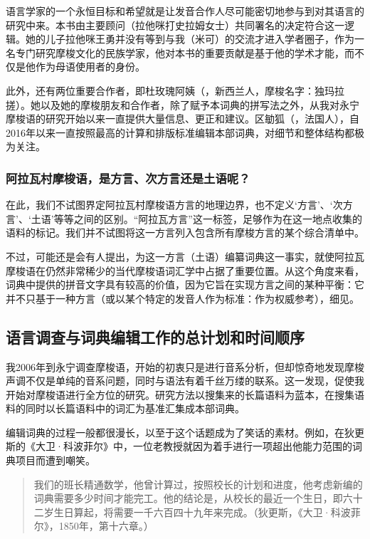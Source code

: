 语言学家的一个永恒目标和希望就是让发音合作人尽可能密切地参与到对其语言的研究中来。本书由主要顾问（拉他咪打史拉姆女士）共同署名的决定符合这一逻辑。她的儿子拉他咪王勇并没有等到与我（米可）的交流才进入学者圈子，作为一名专门研究摩梭文化的民族学家，他对本书的重要贡献是基于他的学术才能，而不仅是他作为母语使用者的身份。

此外，还有两位重要合作者，即杜玫瑰阿姨（，新西兰人，摩梭名字：独玛拉搓）。她以及她的摩梭朋友和合作者，除了赋予本词典的拼写法之外，从我对永宁摩梭语的研究开始以来一直提供大量信息、更正和建议。区勄狐（，法国人），自2016年以来一直按照最高的计算和排版标准编辑本部词典，对细节和整体结构都极为关注。

\subsubsection*{阿拉瓦村摩梭语，是方言、次方言还是土语呢？}

在此，我们不试图界定阿拉瓦村摩梭语方言的地理边界，也不定义‘方言’、‘次方言’、‘土语’等等之间的区别。“阿拉瓦方言”这一标签，足够作为在这一地点收集的语料的标记。我们并不试图将这一方言列入包含所有摩梭方言的某个综合清单中。

不过，可能还是会有人提出，为这一方言（土语）编纂词典这一事实，就使阿拉瓦摩梭语在仍然非常稀少的当代摩梭语词汇学中占据了重要位置。从这个角度来看，词典中提供的拼音文字具有较高的价值，因为它旨在实现方言之间的某种平衡：它并不只基于一种方言（或以某个特定的发音人作为标准：作为权威参考），细见\textcite{dobbs_ortho_2018}。

\subsection{语言调查与词典编辑工作的总计划和时间顺序}

我2006年到永宁调查摩梭语，开始的初衷只是进行音系分析，但却惊奇地发现摩梭声调不仅是单纯的音系问题，同时与语法有着千丝万缕的联系。这一发现，促使我开始对摩梭语进行全方位的研究。研究方法以搜集来的长篇语料为蓝本，在搜集语料的同时以长篇语料中的词汇为基准汇集成本部词典。

编辑词典的过程一般都很漫长，以至于这个话题成为了笑话的素材。例如，在狄更斯的《大卫·科波菲尔》中，一位老教授就因为着手进行一项超出他能力范围的词典项目而遭到嘲笑。
\begin{quotation}
    我们的班长精通数学，他曾计算过，按照校长的计划和进度，他考虑新编的词典需要多少时间才能完工。他的结论是，从校长的最近一个生日，即六十二岁生日算起，将需要一千六百四十九年来完成。（狄更斯，《大卫·科波菲尔》，1850年，第十六章。）
\end{quotation}

